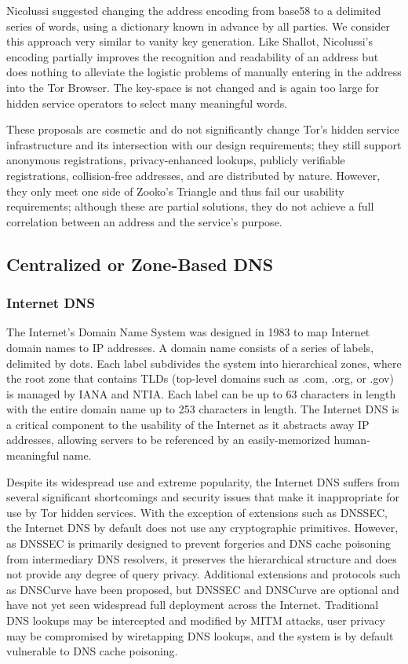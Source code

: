 \documentclass{sig-alternate}
\begin{document}
Nicolussi suggested changing the address encoding from base58 to a delimited series of words, using a dictionary known in advance by all parties.\cite{nicolussi2011human} We consider this approach very similar to vanity key generation. Like Shallot, Nicolussi's encoding partially improves the recognition and readability of an address but does nothing to alleviate the logistic problems of manually entering in the address into the Tor Browser. The key-space is not changed and is again too large for hidden service operators to select many meaningful words.

These proposals are cosmetic and do not significantly change Tor's hidden service infrastructure and its intersection with our design requirements; they still support anonymous registrations, privacy-enhanced lookups, publicly verifiable registrations, collision-free addresses, and are distributed by nature. However, they only meet one side of Zooko's Triangle and thus fail our usability requirements; although these are partial solutions, they do not achieve a full correlation between an address and the service's purpose.

\subsection{Centralized or Zone-Based DNS}

\subsubsection{Internet DNS}

The Internet's Domain Name System was designed in 1983 to map Internet domain names to IP addresses. A domain name consists of a series of labels, delimited by dots. Each label subdivides the system into hierarchical zones, where the root zone that contains TLDs (top-level domains such as .com, .org, or .gov) is managed by IANA and NTIA. Each label can be up to 63 characters in length with the entire domain name up to 253 characters in length. The Internet DNS is a critical component to the usability of the Internet as it abstracts away IP addresses, allowing servers to be referenced by an easily-memorized human-meaningful name.

Despite its widespread use and extreme popularity, the Internet DNS suffers from several significant shortcomings and security issues that make it inappropriate for use by Tor hidden services. With the exception of extensions such as DNSSEC, the Internet DNS by default does not use any cryptographic primitives. However, as DNSSEC is primarily designed to prevent forgeries and DNS cache poisoning from intermediary DNS resolvers, it preserves the hierarchical structure and does not provide any degree of query privacy.\cite{wachs2014censorship} Additional extensions and protocols such as DNSCurve\cite{bernstein2009dnscurve} have been proposed, but DNSSEC and DNSCurve are optional and have not yet seen widespread full deployment across the Internet. Traditional DNS lookups may be intercepted and modified by MITM attacks, user privacy may be compromised by wiretapping DNS lookups, and the system is by default vulnerable to DNS cache poisoning.
\end{document}
